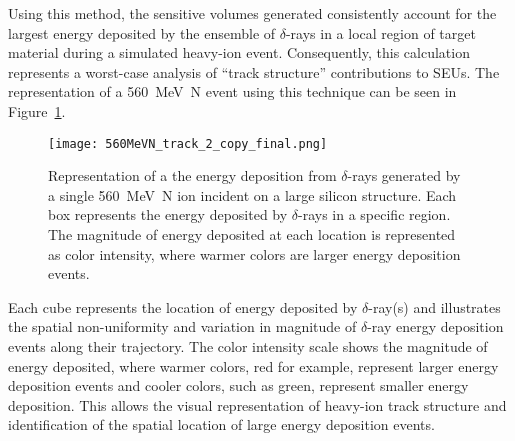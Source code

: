 Using this method, the sensitive volumes generated consistently account for the largest energy deposited by the ensemble of $\delta$-rays in a local region of target material during a simulated heavy-ion event. 
Consequently, this calculation represents a worst-case analysis of ``track structure'' contributions to SEUs. 
The representation of a 560~MeV~N event using this technique can be seen in Figure~\ref{fig:560_MeV_N_track}.
\begin{figure}[htbp]
     \begin{center}
         \texttt{[image: 560MeVN\_track\_2\_copy\_final.png]}
     \end{center}
     \caption{Representation of a the energy deposition from $\delta$-rays generated by a single 560~MeV~N ion incident on a large silicon structure. Each box represents the energy deposited by $\delta$-rays in a specific region. The magnitude of energy deposited at each location is represented as color intensity, where warmer colors are larger energy deposition events.}
     \label{fig:560_MeV_N_track}
 \end{figure} 
Each cube represents the location of energy deposited by $\delta$-ray(s) and illustrates the spatial non-uniformity and variation in magnitude of $\delta$-ray energy deposition events along their trajectory. 
The color intensity scale shows the magnitude of energy deposited, where warmer colors, red for example, represent larger energy deposition events and cooler colors, such as green, represent smaller energy deposition. 
This allows the visual representation of heavy-ion track structure and identification of the spatial location of large energy deposition events.

